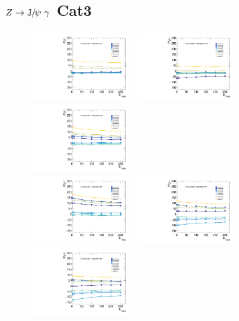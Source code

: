 \subsection{$Z\to \JPsi\ \gamma$ Cat3}
\begin{figure}[!ht]
  \centering
  \includegraphics[width=0.33\textwidth]{Fig/BiasStudy/Linearity/ZJpsiG_Cat3/pull_mean_linearity_TrueFunc0}~
  \includegraphics[width=0.33\textwidth]{Fig/BiasStudy/Linearity/ZJpsiG_Cat3/pull_mean_linearity_TrueFunc1}~
  \includegraphics[width=0.33\textwidth]{Fig/BiasStudy/Linearity/ZJpsiG_Cat3/pull_mean_linearity_TrueFunc2}\\
  \includegraphics[width=0.33\textwidth]{Fig/BiasStudy/Linearity/ZJpsiG_Cat3/pull_mean_linearity_TrueFunc3}~
  \includegraphics[width=0.33\textwidth]{Fig/BiasStudy/Linearity/ZJpsiG_Cat3/pull_mean_linearity_TrueFunc4}~
  \includegraphics[width=0.33\textwidth]{Fig/BiasStudy/Linearity/ZJpsiG_Cat3/pull_mean_linearity_TrueFunc5}\\

\end{figure}
